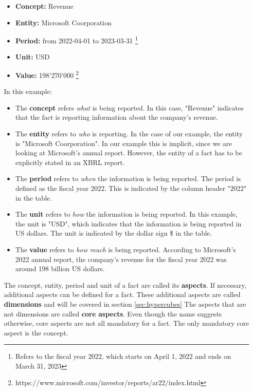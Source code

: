 \begin{itemize}
    \item \textbf{Concept:} Revenue
    \item \textbf{Entity:} Microsoft Coorporation
    \item \textbf{Period:} from 2022-04-01 to 2023-03-31 \footnote[0]{Refers to the fiscal year 2022, which starts on April 1, 2022 and ends on March 31, 2023}
    \item \textbf{Unit:} USD
    \item \textbf{Value:} 198'270'000 \footnote[1]{https://www.microsoft.com/investor/reports/ar22/index.html}
\end{itemize}

In this example:

\begin{itemize}
    \item The \textbf{concept} refers \textit{what} is being reported. 
    In this case, "Revenue" indicates that the fact is reporting information about the company's revenue.
    \item The \textbf{entity} refers to \textit{who} is reporting. 
    In the case of our example, the entity is "Microsoft Coorporation". 
    In our example this is implicit, since we are looking at Microsoft's annual report.
    However, the entity of a fact has to be explicitly stated in an XBRL report.
    \item The \textbf{period} refers to \textit{when} the information is being reported.
    The period is defined as the fiscal year 2022.
    This is indicated by the column header "2022" in the table.
    \item The \textbf{unit} refers to \textit{how} the information is being reported.
    In this example, the unit is "USD", which indicates that the information is being reported in US dollars.
    The unit is indicated by the dollar sign \$ in the table.
    \item The \textbf{value} refers to \textit{how much} is being reported.
    According to Microsoft's 2022 annual report, the company's revenue for the fiscal year 2022 was around 198 billion US dollars.
\end{itemize}

The concept, entity, period and unit of a fact are called its \textbf{aspects}. 
If necessary, additional aspects can be defined for a fact. 
These additional aspects are called \textbf{dimensions} and will be covered in section \ref{sec:hypercubes}
The aspects that are not dimensions are called \textbf{core aspects}. 
Even though the name suggests otherwise, core aspects are not all mandatory for a fact.
The only mandatory core aspect is the concept.